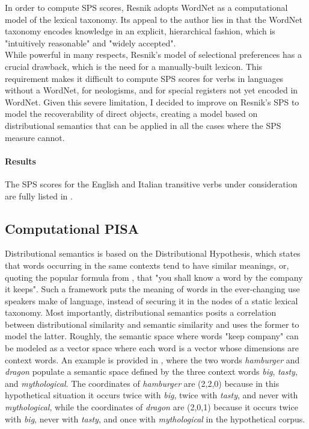 In order to compute SPS scores, Resnik adopts WordNet \parencite{beckwith1991wordnet,Miller1995} as a computational model of the lexical taxonomy. Its appeal to the author \parencite[32]{Resnik1993} lies in that the WordNet taxonomy encodes knowledge in an explicit, hierarchical fashion, which is "intuitively reasonable" and "widely accepted".\\ While powerful in many respects, Resnik's model of selectional preferences has a crucial drawback, which is the need for a manually-built lexicon. This requirement makes it difficult to compute SPS scores for verbs in languages without a WordNet, for neologisms, and for special registers not yet encoded in WordNet. Given this severe limitation, I decided to improve on Resnik's SPS to model the recoverability of direct objects, creating a model based on distributional semantics \parencite{Lenci:2018} that can be applied in all the cases where the SPS measure cannot.

\paragraph{Results}
The SPS scores for the English and Italian transitive verbs under consideration are fully listed in .\\ %

\subsection{Computational PISA} 

Distributional semantics is based on the Distributional Hypothesis, which states that words occurring in the same contexts tend to have similar meanings, or, quoting the popular formula from \textcite{firth1957synopsis}, that "you shall know a word by the company it keeps". Such a framework puts the meaning of words in the ever-changing use speakers make of language, instead of securing it in the nodes of a static lexical taxonomy. Most importantly, distributional semantics posits a correlation between distributional similarity and semantic similarity and uses the former to model the latter. Roughly, the semantic space where words "keep company" can be modeled as a vector space where each word is a vector whose dimensions are context words. An example is provided in , where the two words \textit{hamburger} and \textit{dragon} populate a semantic space defined by the three context words \textit{big}, \textit{tasty}, and \textit{mythological}. The coordinates of \textit{hamburger} are (2,2,0) because in this hypothetical situation it occurs twice with \textit{big}, twice with \textit{tasty}, and never with \textit{mythological}, while the coordinates of \textit{dragon} are (2,0,1) because it occurs twice with \textit{big}, never with \textit{tasty}, and once with \textit{mythological} in the hypothetical corpus.

